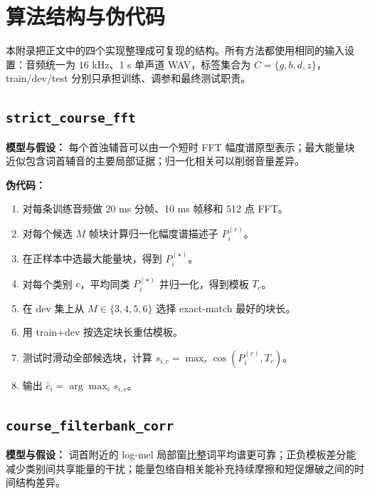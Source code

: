 \section{算法结构与伪代码}

本附录把正文中的四个实现整理成可复现的结构。所有方法都使用相同的输入设置：音频统一为 $16$ kHz、1 s 单声道 WAV，标签集合为 $C=\{g,b,d,z\}$，train/dev/test 分别只承担训练、调参和最终测试职责。

\subsection{\texttt{strict\_course\_fft}}
\label{alg:strict-course}

\textbf{模型与假设：} 每个首浊辅音可以由一个短时 FFT 幅度谱原型表示；最大能量块近似包含词首辅音的主要局部证据；归一化相关可以削弱音量差异。

\textbf{伪代码：}
\begin{enumerate}[nosep]
    \item 对每条训练音频做 20 ms 分帧、10 ms 帧移和 512 点 FFT。
    \item 对每个候选 $M$ 帧块计算归一化幅度谱描述子 $P_i^{(r)}$。
    \item 在正样本中选最大能量块，得到 $P_i^{(\star)}$。
    \item 对每个类别 $c$，平均同类 $P_i^{(\star)}$ 并归一化，得到模板 $T_c$。
    \item 在 dev 集上从 $M\in\{3,4,5,6\}$ 选择 exact-match 最好的块长。
    \item 用 train+dev 按选定块长重估模板。
    \item 测试时滑动全部候选块，计算 $s_{i,c}=\max_r\cos(P_i^{(r)},T_c)$。
    \item 输出 $\hat c_i=\arg\max_c s_{i,c}$。
\end{enumerate}

\subsection{\texttt{course\_filterbank\_corr}}
\label{alg:course-filterbank}

\textbf{模型与假设：} 词首附近的 log-mel 局部窗比整词平均谱更可靠；正负模板差分能减少类别间共享能量的干扰；能量包络自相关能补充持续摩擦和短促爆破之间的时间结构差异。

